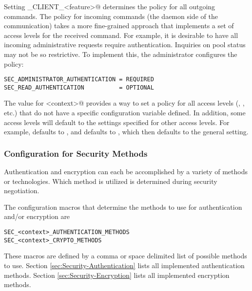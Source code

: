 Setting \verb@SEC_CLIENT_<feature>@ determines the policy for all
outgoing commands.
The policy for incoming commands
(the daemon side of the communication)
takes a more fine-grained approach that implements a set of
access levels for the received command.
For example, it is desirable to have all incoming administrative
requests require authentication.
Inquiries on pool status may not be so restrictive.
To implement this, the administrator configures the policy:

\begin{verbatim}
SEC_ADMINISTRATOR_AUTHENTICATION = REQUIRED
SEC_READ_AUTHENTICATION          = OPTIONAL
\end{verbatim}

The \verb@DEFAULT@ value for \verb@<context>@ provides a way
to set a policy for all access levels
(\verb@READ@, \verb@WRITE@, etc.)
that do not have a specific configuration variable defined.
In addition, some access levels will default to the settings specified
for other access levels.  For example, 
defaults to , and  defaults to
, which then defaults to the general \verb@DEFAULT@
setting.

\subsubsection{\label{sec:security-negotiation-methods}Configuration for 
Security Methods}

Authentication and encryption can each be accomplished by a variety
of methods or technologies.
Which method is utilized is determined during
security negotiation.

The configuration macros that determine the methods
to use for authentication and/or encryption are
\begin{verbatim}
SEC_<context>_AUTHENTICATION_METHODS
SEC_<context>_CRYPTO_METHODS
\end{verbatim}

These macros are defined by a comma or space delimited list of
possible methods to use.
Section \ref{sec:Security-Authentication} lists all implemented
authentication methods.
Section \ref{sec:Security-Encryption} lists all implemented
encryption methods.



